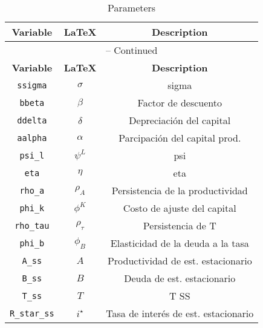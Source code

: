 \begin{center}
\begin{longtable}{ccc}
\caption{Parameters}\\%
\hline%
\multicolumn{1}{c}{\textbf{Variable}} &
\multicolumn{1}{c}{\textbf{\LaTeX}} &
\multicolumn{1}{c}{\textbf{Description}}\\%
\hline\hline%
\endfirsthead
\multicolumn{3}{c}{{\tablename} \thetable{} -- Continued}\\%
\hline%
\multicolumn{1}{c}{\textbf{Variable}} &
\multicolumn{1}{c}{\textbf{\LaTeX}} &
\multicolumn{1}{c}{\textbf{Description}}\\%
\hline\hline%
\endhead
\texttt{ssigma} & $\sigma$ & sigma\\
\texttt{bbeta} & $\beta$ & Factor de descuento\\
\texttt{ddelta} & $\delta$ & Depreciación del capital\\
\texttt{aalpha} & $\alpha$ & Parcipación del capital prod.\\
\texttt{psi\_l} & $\psi^L$ & psi\\
\texttt{eta} & $\eta$ & eta\\
\texttt{rho\_a} & $\rho_{A}$ & Persistencia de la productividad\\
\texttt{phi\_k} & $\phi^{K}$ & Costo de ajuste del capital\\
\texttt{rho\_tau} & $\rho_{\tau}$ & Persistencia de T\\
\texttt{phi\_b} & $\phi_{B}$ & Elasticidad de la deuda a la tasa\\
\texttt{A\_ss} & $A$ & Productividad de est. estacionario\\
\texttt{B\_ss} & $B$ & Deuda de est. estacionario\\
\texttt{T\_ss} & $T$ & T SS\\
\texttt{R\_star\_ss} & $i^{\star}$ & Tasa de interés de est. estacionario\\
\hline%
\end{longtable}
\end{center}
